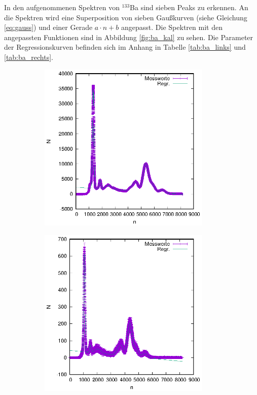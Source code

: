 In den aufgenommenen Spektren von $^{133}$Ba sind sieben Peaks zu erkennen. An die Spektren wird eine Superposition von sieben Gaußkurven (siehe Gleichung \ref{eq:gauss}) und einer Gerade $a\cdot n+b$ angepasst. Die Spektren mit den angepassten Funktionen sind in Abbildung \ref{fig:ba_kal} zu sehen. Die Parameter der Regressionskurven befinden sich im Anhang in Tabelle \ref{tab:ba_links} und \ref{tab:ba_rechts}. 
\begin{figure}[h!]
  \centering
  \begin{subfigure}[h]{0.5\textwidth}
    \centering
    \includegraphics[width=0.9\textwidth]{data/Energiespektren/links_ba_cfd_kal.eps}
    \label{fig:ba_kal_links}
  \end{subfigure}%
  \begin{subfigure}[h]{0.5\textwidth}
    \centering
    \includegraphics[width=0.9\textwidth]{data/Energiespektren/rechts_ba_cfd_kal.eps}

\end{subfigure}
\end{figure}
